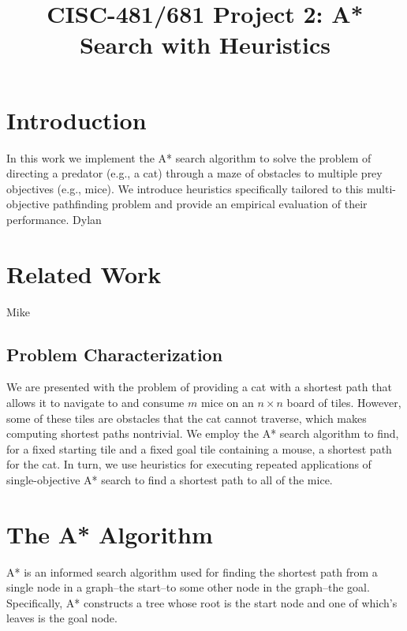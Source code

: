 \documentclass[12pt, conference, compsocconf]{IEEEtran}
\begin{document}
\title{CISC-481/681 Project 2: A* Search with Heuristics}

\author{ }

\maketitle

\section{Introduction}
In this work we implement the A* search algorithm to solve the problem of directing a predator (e.g., a cat) through a maze of obstacles to multiple prey objectives (e.g., mice). 
We introduce heuristics specifically tailored to this multi-objective pathfinding problem and provide an empirical evaluation of their performance. 
Dylan

\section{Related Work}
Mike

\subsection{Problem Characterization}
We are presented with the problem of providing a cat with a shortest path that allows it to navigate to and consume $m$ mice on an $n \times n$ board of tiles. 
However, some of these tiles are obstacles that the cat cannot traverse, which makes computing shortest paths nontrivial.
We employ the A* search algorithm to find, for a fixed starting tile and a fixed goal tile containing a mouse, a shortest path for the cat. 
In turn, we use heuristics for executing repeated applications of single-objective A* search to find a shortest path to all of the mice. 

\section{The A* Algorithm}
A* is an informed search algorithm used for finding the shortest path from a single node in a graph--the start--to some other node in the graph--the goal. 
Specifically, A* constructs a tree whose root is the start node and one of which's leaves is the goal node. 
\end{document}
